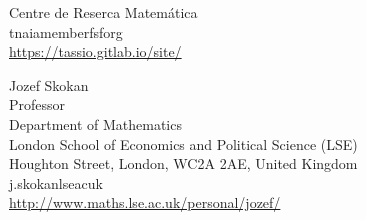 \documentclass{aic}
\begin{document}
\begin{aicauthors}
\begin{authorinfo}[naia]
  Centre de Reserca Matemática \\
  tnaia\imageat{}member\imagedot{}fsf\imagedot{}org \\
  \url{https://tassio.gitlab.io/site/}
\end{authorinfo}
\begin{authorinfo}[skokan]
  Jozef Skokan\\
  Professor\\
  Department of Mathematics\\
  London School of Economics and Political Science (LSE) \\
  Houghton Street, London, WC2A 2AE, United Kingdom\\
  j.skokan\imageat{}lse\imagedot{}ac\imagedot{}uk \\
  \url{http://www.maths.lse.ac.uk/personal/jozef/}
\end{authorinfo}
\end{aicauthors}
\end{document}
